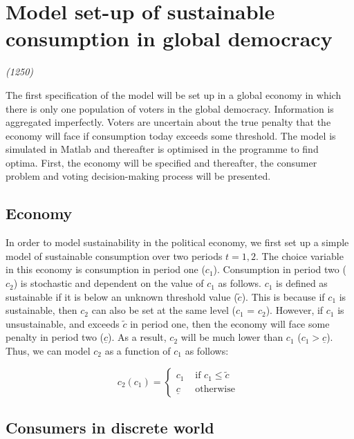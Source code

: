\documentclass[11pt,preprint, authoryear]{elsarticle}
\numberwithin{equation}{section}
\numberwithin{figure}{section}
\numberwithin{table}{section}
\begin{document}
\hypertarget{model-set-up-of-sustainable-consumption-in-global-democracy}{%
\section{Model set-up of sustainable consumption in global
democracy}\label{model-set-up-of-sustainable-consumption-in-global-democracy}}

\emph{(1250)}

The first specification of the model will be set up in a global economy
in which there is only one population of voters in the global democracy.
Information is aggregated imperfectly. Voters are uncertain about the
true penalty that the economy will face if consumption today exceeds
some threshold. The model is simulated in Matlab and thereafter is
optimised in the programme to find optima. First, the economy will be
specified and thereafter, the consumer problem and voting
decision-making process will be presented.

\hypertarget{economy}{%
\subsection*{Economy}\label{economy}}

In order to model sustainability in the political economy, we first set
up a simple model of sustainable consumption over two periods
\(t = 1, 2\). The choice variable in this economy is consumption in
period one (\(c_1\)). Consumption in period two (\(c_2\)) is stochastic
and dependent on the value of \(c_1\) as follows. \(c_1\) is defined as
sustainable if it is below an unknown threshold value (\(\tilde{c}\)).
This is because if \(c_1\) is sustainable, then \(c_2\) can also be set
at the same level (\(c_1\) = \(c_2\)). However, if \(c_1\) is
unsustainable, and exceeds \(\tilde{c}\) in period one, then the economy
will face some penalty in period two (\(\underline{c}\)). As a result,
\(c_2\) will be much lower than \(c_1\) (\(c_1> \underline{c}\)). Thus,
we can model \(c_2\) as a function of \(c_1\) as follows:

\[
c_2\left(c_1\right)= \begin{cases}c_1 & \text { if } c_1 \leq \tilde{c} \\ \underline{c} & \text { otherwise }\end{cases}
\]

\hypertarget{consumers-in-discrete-world}{%
\subsection*{Consumers in discrete
world}\label{consumers-in-discrete-world}}
\end{document}
